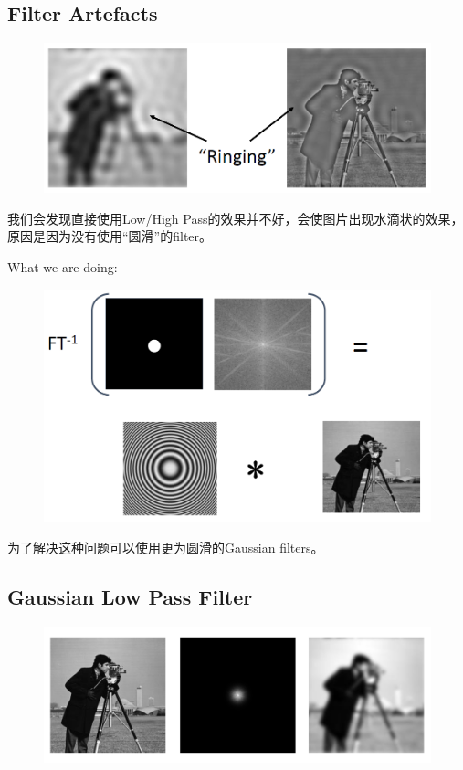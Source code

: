 \documentclass[11pt]{article}
\begin{document}
\subsection{Filter Artefacts}
\begin{figure}[bht!]
  \centering
  \includegraphics[width=\textwidth]{images/art.png}
\end{figure}
\begin{framed}
  \begin{center}
    我们会发现直接使用Low/High Pass的效果并不好，会使图片出现水滴状的效果，原因是因为没有使用“圆滑”的filter。
  \end{center}
\end{framed}
What we are doing:
\begin{figure}[bht!]
  \centering
  \includegraphics[width=\textwidth]{images/art3.png}
\end{figure}
为了解决这种问题可以使用更为圆滑的Gaussian filters。

\newpage
\subsection{Gaussian Low Pass Filter}
\begin{figure}[bht!]
  \centering
  \includegraphics[width=\textwidth]{images/glp.png}
\end{figure}
\end{document}
